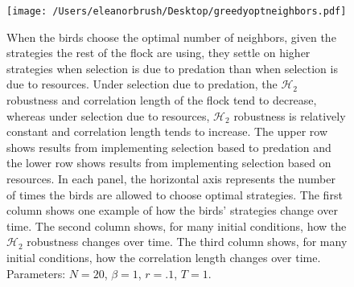 \documentclass{article}
\begin{document}
\begin{figure}
\texttt{[image: /Users/eleanorbrush/Desktop/greedyoptneighbors.pdf]}
\caption{\label{greedyopt} When the birds choose the optimal number of neighbors, given the strategies the rest of the flock are using, they settle on higher strategies when selection is due to predation than when selection is due to resources. Under selection due to predation, the $\mathscr{H}_2$ robustness and correlation length of the flock tend to decrease, whereas under selection due to resources, $\mathscr{H}_2$ robustness is relatively constant and correlation length tends to increase. The upper row shows results from implementing selection based to predation and the lower row shows results from implementing selection based on resources. In each panel, the  horizontal axis represents the number of times the birds are allowed to choose optimal strategies. The first column shows one example of how the birds' strategies change over time. The second column shows, for many initial conditions, how the $\mathscr{H}_2$ robustness changes over time. The third column shows, for many initial conditions, how the correlation length changes over time. Parameters:  $N=20$, $\beta=1$, $r=.1$, $T=1$. 
}
\end{figure}



\nocite{*}


\end{document}
